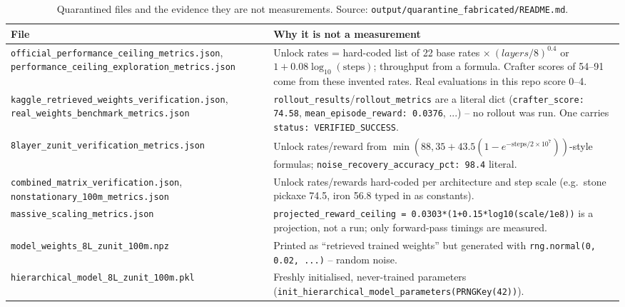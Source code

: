 \documentclass[11pt]{article}
\newcommand{\srcpath}[1]{\texttt{\small #1}}
\begin{document}
\begin{table}[h]
\centering
\small
\caption{Quarantined files and the evidence they are not measurements. Source: \srcpath{output/quarantine\_fabricated/README.md}.}
\begin{tabular}{p{5.2cm}p{9.3cm}}
\toprule
File & Why it is not a measurement \\
\midrule
\texttt{official\_performance\_ceiling\_metrics.json}, \texttt{performance\_ceiling\_exploration\_metrics.json} & Unlock rates = hard-coded list of 22 base rates $\times\ (layers/8)^{0.4}$ or $1+0.08\log_{10}(\text{steps})$; throughput from a formula. Crafter scores of 54--91 come from these invented rates. Real evaluations in this repo score 0--4. \\
\texttt{kaggle\_retrieved\_weights\_verification.json}, \texttt{real\_weights\_benchmark\_metrics.json} & \texttt{rollout\_results}/\texttt{rollout\_metrics} are a literal dict (\texttt{crafter\_score: 74.58}, \texttt{mean\_episode\_reward: 0.0376}, ...) -- no rollout was run. One carries \texttt{status: VERIFIED\_SUCCESS}. \\
\texttt{8layer\_zunit\_verification\_metrics.json} & Unlock rates/reward from $\min(88,35+43.5(1-e^{-\text{steps}/2\times10^7}))$-style formulas; \texttt{noise\_recovery\_accuracy\_pct: 98.4} literal. \\
\texttt{combined\_matrix\_verification.json}, \texttt{nonstationary\_100m\_metrics.json} & Unlock rates/rewards hard-coded per architecture and step scale (e.g.\ stone pickaxe 74.5, iron 56.8 typed in as constants). \\
\texttt{massive\_scaling\_metrics.json} & \texttt{projected\_reward\_ceiling = 0.0303*(1+0.15*log10(scale/1e8))} is a projection, not a run; only forward-pass timings are measured. \\
\texttt{model\_weights\_8L\_zunit\_100m.npz} & Printed as ``retrieved trained weights'' but generated with \texttt{rng.normal(0, 0.02, ...)} -- random noise. \\
\texttt{hierarchical\_model\_8L\_zunit\_100m.pkl} & Freshly initialised, never-trained parameters (\texttt{init\_hierarchical\_model\_parameters(PRNGKey(42))}). \\
\bottomrule
\end{tabular}
\end{table}
\end{document}
